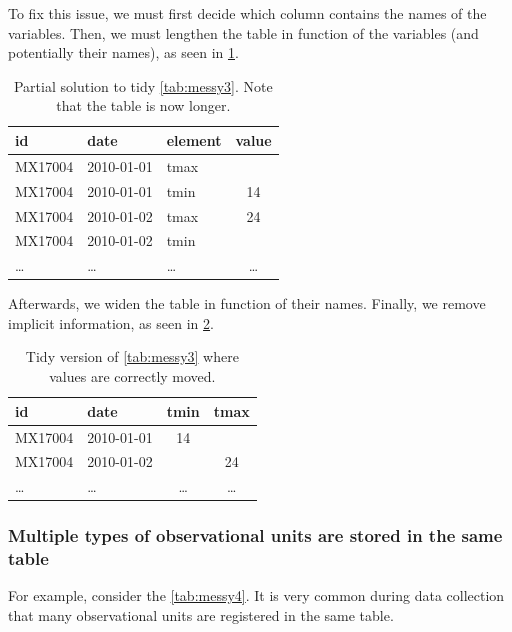 To fix this issue, we must first decide which column contains the names of the variables.
Then, we must lengthen the table in function of the variables (and potentially their
names), as seen in \cref{tab:tidy3a}.

\begin{table}
  \centering
  \begin{tabular}{lllc}
    \toprule
    \textbf{id} & \textbf{date} & \textbf{element} & \textbf{value} \\
    \midrule
    MX17004 & 2010-01-01 & tmax &    \\
    MX17004 & 2010-01-01 & tmin & 14 \\
    MX17004 & 2010-01-02 & tmax & 24 \\
    MX17004 & 2010-01-02 & tmin &    \\
    \dots & \dots & \dots & \dots \\
    \bottomrule
  \end{tabular}
  \caption{
    Partial solution to tidy \cref{tab:messy3}. Note that the table is now longer.
  }
  \label{tab:tidy3a}
\end{table}

Afterwards, we widen the table in function of their names.  Finally, we remove
implicit information, as seen in \cref{tab:tidy3b}.

\begin{table}
  \centering
  \begin{tabular}{llcc}
    \toprule
    \textbf{id} & \textbf{date} & \textbf{tmin} & \textbf{tmax} \\
    \midrule
    MX17004 & 2010-01-01 & 14 &    \\
    MX17004 & 2010-01-02 &    & 24 \\
    \dots & \dots & \dots & \dots \\
    \bottomrule
  \end{tabular}
  \caption{Tidy version of \cref{tab:messy3} where values are correctly moved.}
  \label{tab:tidy3b}
\end{table}

\subsubsection{Multiple types of observational units are stored in the same table}  For
example, consider the \cref{tab:messy4}.  It is very common during data collection that
many observational units are registered in the same table.

